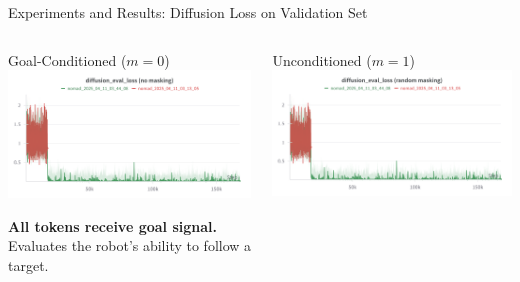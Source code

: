 \documentclass{beamer}
\begin{document}
    \begin{frame}{Experiments and Results: Diffusion Loss on Validation Set}
        \begin{columns}
            \begin{column}{0.48\textwidth}
                \begin{block}{\centering Goal-Conditioned ($m = 0$)}
                    \centering
                    \includegraphics[width=\textwidth]{images/diff_eval_no_masking.png}
                    
                    \vspace{0.5em}
                    \tiny \textbf{All tokens receive goal signal.} \\
                    Evaluates the robot’s ability to follow a target.
                \end{block}
            \end{column}
            
            \begin{column}{0.48\textwidth}
                \begin{block}{\centering Unconditioned ($m = 1$)}
                    \centering
                    \includegraphics[width=\textwidth]{images/diff_eval_random.png}
                    

\end{block}
\end{column}
\end{columns}
\end{frame}
\end{document}
